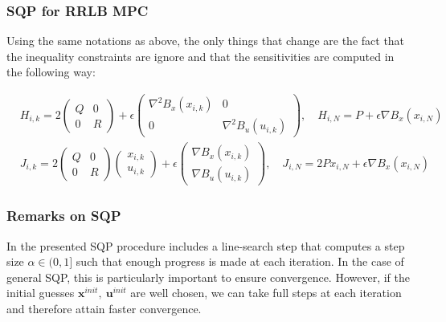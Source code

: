 \documentclass[12pt]{article}
\begin{document}
\subsubsection{SQP for RRLB MPC}

Using the same notations as above, the only things that change are the fact that the inequality constraints are ignore and that the sensitivities are computed in the following way:

\begin{align*}
	&H_{i,k}=2\begin{pmatrix}Q&0\\0&R\end{pmatrix}+\epsilon\begin{pmatrix}\nabla^2B_x(x_{i,k})&0\\0&\nabla^2B_u(u_{i,k})\end{pmatrix},\quad H_{i,N}=P+\epsilon\nabla B_x(x_{i,N})\\
	&J_{i,k}=2\begin{pmatrix}Q&0\\0&R\end{pmatrix}\begin{pmatrix} x_{i,k}\\ u_{i,k}\end{pmatrix}+\epsilon\begin{pmatrix}\nabla B_x(x_{i,k})\\\nabla B_u(u_{i,k})\end{pmatrix},\quad J_{i,N}=2P x_{i,N}+\epsilon\nabla B_x(x_{i,N})
\end{align*}

\subsubsection{Remarks on SQP}

In \cite{mpc-rti} the presented SQP procedure includes a line-search step that computes a step size $\alpha\in(0,1]$ such that enough progress is made at each iteration.
In the case of general SQP, this is particularly important to ensure convergence.
However, if the initial guesses $\mathbf{x}^{init},~\mathbf{u}^{init}$ are well chosen, we can take full steps at each iteration and therefore attain faster convergence.
\end{document}
